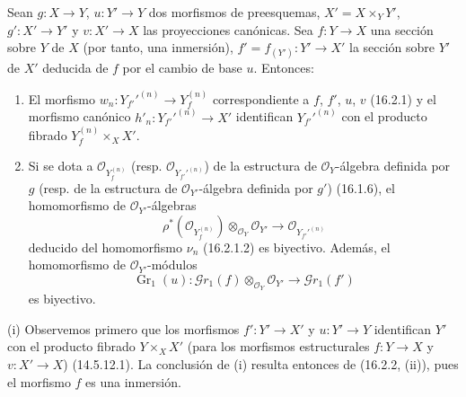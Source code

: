 \begin{corollary}[16.2.3]
\label{IV.16.2.3}
Sean $g:X\to Y$, $u:Y'\to Y$ dos morfismos de preesquemas,
$X'=X\times_Y Y'$, $g':X'\to Y'$ y $v:X'\to X$ las proyecciones canónicas.
Sea $f:Y\to X$ una sección sobre $Y$ de $X$ (por tanto, una inmersión),
$f'=f_{(Y')}:Y'\to X'$ la sección sobre $Y'$ de $X'$ deducida de $f$ por el
cambio de base $u$. Entonces:
\begin{enumerate}
\item[\textup{(i)}] El morfismo
$w_n:Y_{f'}'^{(n)}\to Y_f^{(n)}$ correspondiente a $f$, $f'$, $u$, $v$
\textup{(16.2.1)} y el morfismo canónico
$h'_n:Y_{f'}'^{(n)}\to X'$ identifican $Y_{f'}'^{(n)}$ con el producto fibrado
$Y_f^{(n)}\times_X X'$.
\item[\textup{(ii)}] Si se dota a $\mathcal{O}_{Y_f^{(n)}}$ \textup{(resp.}
$\mathcal O_{Y_{f'}'^{(n)}}$\textup{)} de la estructura de $\mathcal{O}_Y$-álgebra
definida por $g$ \textup{(resp.} de la estructura de $\mathcal{O}_{Y'}$-álgebra definida
por $g'$\textup{)} \textup{(16.1.6)}, el homomorfismo de $\mathcal{O}_{Y'}$-álgebras
\[
  \rho^*(\mathcal{O}_{Y_f^{(n)}})
  \otimes_{\mathcal{O}_Y}\mathcal{O}_{Y'}
  \longrightarrow
  \mathcal{O}_{Y_{f'}'^{(n)}}
  \tag{16.2.3.1}
  \label{IV.16.2.3.1}
\]
deducido del homomorfismo $\nu_n$ \textup{(16.2.1.2)} es biyectivo. Además,
el homomorfismo de $\mathcal{O}_{Y'}$-módulos
\[
  \operatorname{Gr}_1(u):
  \mathscr{G}r_1(f)\otimes_{\mathcal{O}_Y}\mathcal{O}_{Y'}
  \longrightarrow\mathscr{G}r_1(f')
  \tag{16.2.3.2}
  \label{IV.16.2.3.2}
\]
es biyectivo.
\end{enumerate}
\end{corollary}

\noindent(i) Observemos primero que los morfismos $f':Y'\to X'$ y $u:Y'\to Y$
identifican $Y'$ con el producto fibrado $Y\times_X X'$ (para los morfismos estructurales
$f:Y\to X$ y $v:X'\to X$) (14.5.12.1). La conclusión de (i) resulta entonces de
(16.2.2, (ii)), pues el morfismo $f$ es una inmersión.

